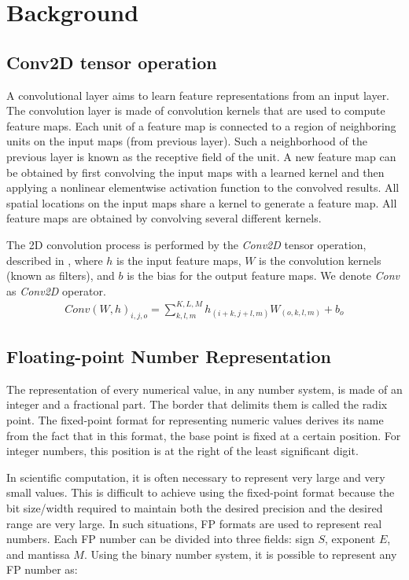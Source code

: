 \section{Background}
\label{sec:background}

\subsection{Conv2D tensor operation}
A convolutional layer aims to learn feature representations from an input layer. The convolution layer is made of convolution kernels that are used to compute feature maps. Each unit of a feature map is connected to a region of neighboring units on the input maps (from previous layer). Such a neighborhood of the previous layer is known as the receptive field of the unit. A new feature map can be obtained by first convolving the input maps with a learned kernel and then applying a nonlinear elementwise activation function to the convolved results. All spatial locations on the input maps share a kernel to generate a feature map. All feature maps are obtained by convolving several different kernels\cite{gu2018recent}.


The 2D convolution process is performed by the \emph{Conv2D} tensor operation, described in , where $h$ is the input feature maps, $W$ is the convolution kernels (known as filters), and $b$ is the bias for the output feature maps\cite{goodfellow2016deep}. We denote \emph{Conv} as \emph{Conv2D} operator.
\begin{eqnarray} \label{eq:conv2D}
Conv\left(W,h\right)_{i,j,o}=\sum_{k,l,m}^{K,L,M} h_{(i+k,j+l,m)} W_{(o,k,l,m)}+b_{o}
\end{eqnarray}

\subsection{Floating-point Number Representation}
The representation of every numerical value, in any number system, is made of an integer and a fractional part. The border that delimits them is called the radix point. The fixed-point format for representing numeric values derives its name from the fact that in this format, the base point is fixed at a certain position. For integer numbers, this position is at the right of the least significant digit.

In scientific computation, it is often necessary to represent very large and very small values. This is difficult to achieve using the fixed-point format because the bit size/width required to maintain both the desired precision and the desired range are very large. In such situations, FP formats are used to represent real numbers. Each FP number can be divided into three fields: sign $S$, exponent $E$, and mantissa $M$. Using the binary number system, it is possible to represent any FP number as:

